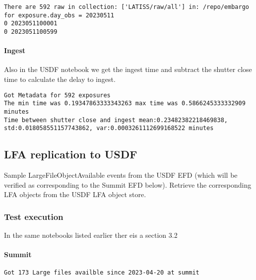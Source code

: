 \begin{verbatim}
There are 592 raw in collection: ['LATISS/raw/all'] in: /repo/embargo for exposure.day_obs = 20230511
0 2023051100001
0 2023051100599
\end{verbatim}

\paragraph {Ingest}
Also in the USDF notebook we get the ingest time and subtract the shutter close time to calculate the
delay to ingest.
\begin{verbatim}
Got Metadata for 592 exposures
The min time was 0.19347863333343263 max time was 0.5866245333332909 minutes
Time between shutter close and ingest mean:0.23482382218469838, std:0.018058551157743862, var:0.0003261112699168522 minutes
\end{verbatim}

\subsection{LFA replication to USDF }
Sample LargeFileObjectAvailable events from the USDF EFD (which will be verified as corresponding to the Summit EFD below).
Retrieve the corresponding LFA objects from the USDF LFA object store.
\subsubsection{Test execution}
In the same notebooks  listed earlier ther eis a section 3.2
\paragraph{Summit}
\begin{verbatim}
Got 173 Large files availble since 2023-04-20 at summit
\end{verbatim}

